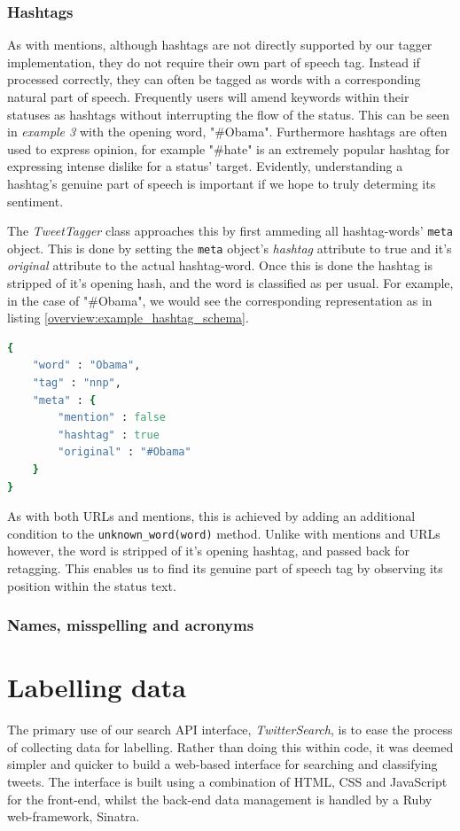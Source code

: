 \subsubsection{Hashtags}

As with mentions, although hashtags are not directly supported by our tagger implementation, they do not require their own part of speech tag. Instead if processed correctly, they can often be tagged as words with a corresponding natural part of speech. Frequently users will amend keywords within their statuses as hashtags without interrupting the flow of the status. This can be seen in \emph{example 3} with the opening word, "\#Obama". Furthermore hashtags are often used to express opinion, for example "\#hate" is an extremely popular hashtag for expressing intense dislike for a status' target. Evidently, understanding a hashtag's genuine part of speech is important if we hope to truly determing its sentiment.

The \emph{TweetTagger} class approaches this by first ammeding all hashtag-words' \texttt{meta} object. This is done by setting the \texttt{meta} object's \emph{hashtag} attribute to true and it's \emph{original} attribute to the actual hashtag-word. Once this is done the hashtag is stripped of it's opening hash, and the word is classified as per usual. For example, in the case of "\#Obama", we would see the corresponding representation as in listing \ref{overview:example_hashtag_schema}.

\begin{lstlisting}[language=Ruby, numbers=none, caption={Example JSON structure for representing a hashtag word}, label=overview:example_hashtag_schema]
{
	"word" : "Obama", 
	"tag" : "nnp",
	"meta" : {
		"mention" : false
		"hashtag" : true
		"original" : "#Obama"
	}
}
\end{lstlisting}

As with both URLs and mentions, this is achieved by adding an additional condition to the \texttt{unknown\_word(word)} method. Unlike with mentions and URLs however, the word is stripped of it's opening hashtag, and passed back for retagging. This enables us to find its genuine part of speech tag by observing its position within the status text.

\subsubsection{Names, misspelling and acronyms}

\section{Labelling data}
\label{retrieval:labelling}

The primary use of our search API interface, \emph{TwitterSearch}, is to ease the process of collecting data for labelling. Rather than doing this within code, it was deemed simpler and quicker to build a web-based interface for searching and classifying tweets. The interface is built using a combination of HTML, CSS and JavaScript for the front-end, whilst the back-end data management is handled by a Ruby web-framework, Sinatra.

